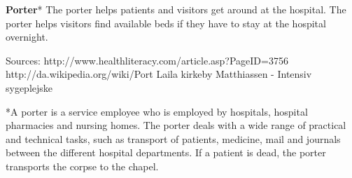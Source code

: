 \textbf{Porter}*
The porter helps patients and visitors get around at the hospital. The porter helps visitors find available beds if they have to stay at the hospital overnight. 

Sources:
http://www.healthliteracy.com/article.asp?PageID=3756
http://da.wikipedia.org/wiki/Port%
Laila kirkeby Matthiassen - Intensiv sygeplejske

*A porter is a service employee who is employed by hospitals, hospital pharmacies and nursing homes. The porter deals with a wide range of practical and technical tasks, such as transport of patients, medicine, mail and journals between the different hospital departments. If a patient is dead, the porter transports the corpse to the chapel.

